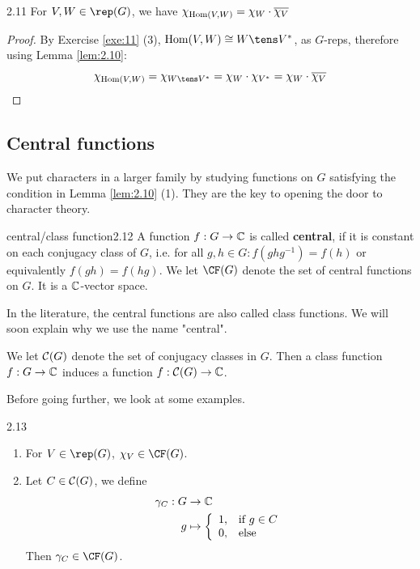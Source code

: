 \documentclass[twoside = false,	%
		headsepline,		%
		parskip = true,
		]{scrbook}						%
\begin{document}
        \begin{corollary}{}{2.11}
            For $V,W \in \rep(G)$, we have $\chi_{\mathrm{Hom}(V,W)} = \chi_W \cdot \overline{\chi_V}$
        \end{corollary}
        \begin{proof}
            By Exercise \ref{exe:11} (3), $\Hom(V,W) \cong W \tens V^*$, as $G$-reps, therefore using Lemma \ref{lem:2.10}:
            \begin{equation*}
                \chi_{\Hom(V,W)} = \chi_{W \tens V^*} = \chi_W \cdot \chi_{V^*} = \chi_W \cdot \overline{\chi_V}
            \end{equation*}
        \end{proof}
\subsection{Central functions}
    We put characters in a larger family by studying functions on $G$ satisfying the condition in Lemma \ref{lem:2.10} (1). They are the key to opening the door to character theory.

    \begin{definition}{central/class function}{2.12}
        A function $f: G \to \mathbb C$ is called \textbf{central}, if it is constant on each conjugacy class of $G$, i.e. for all $g,h \in G: f(ghg^{-1}) = f(h)$ or equivalently $f(gh) = f(hg)$. We let $\CF(G)$ denote the set of central functions on $G$. It is a $\mathbb C$-vector space.
    \end{definition}
    In the literature, the central functions are also called class functions. We will soon explain why we use the name "central".

    We let $\mathcal C(G)$ denote the set of conjugacy classes in $G$. Then a class function $f:G \to \mathbb C$ induces a function $f: \mathcal C(G) \to \mathbb C$.
    
    Before going further, we look at some examples.
    \begin{example}{}{2.13}
        \begin{enumerate}
            \item
                For $V \in \rep(G)$, $\chi_V \in \CF(G)$.
            \item
                Let $C \in \mathcal C(G)$, we define
                \begin{equation*}
                \begin{split}
                    \gamma_C: G &\to \mathbb C \\
                            g &\mapsto \left\{ \begin{array}{cl}
                                1, & \text{if } g \in C  \\
                                0, & \text{else}
                            \end{array} \right.
                \end{split}
                \end{equation*}
                Then $\gamma_C \in \CF(G)$.
        \end{enumerate}
    \end{example}
    
\end{document}
